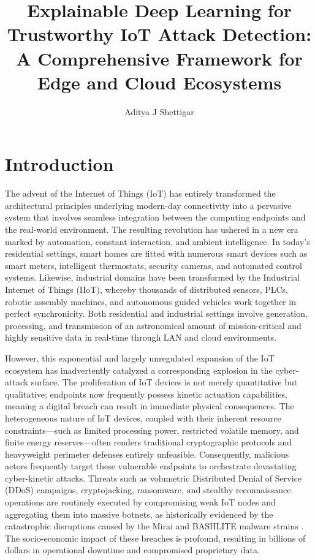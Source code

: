 \documentclass[12pt]{article}
\title{Explainable Deep Learning for Trustworthy IoT Attack Detection: A Comprehensive Framework for Edge and Cloud Ecosystems}
\author{Aditya J Shettigar}
\date{}
\begin{document}
    \maketitle


    \section{Introduction}
    The advent of the Internet of Things (IoT) has entirely transformed the architectural principles underlying modern-day connectivity into a pervasive system that involves seamless integration between the computing endpoints and the real-world environment. The resulting revolution has ushered in a new era marked by automation, constant interaction, and ambient intelligence. In today's residential settings, smart homes are fitted with numerous smart devices such as smart meters, intelligent thermostats, security cameras, and automated control systems. Likewise, industrial domains have been transformed by the Industrial Internet of Things (IIoT), whereby thousands of distributed sensors, PLCs, robotic assembly machines, and autonomous guided vehicles work together in perfect synchronicity. Both residential and industrial settings involve generation, processing, and transmission of an astronomical amount of mission-critical and highly sensitive data in real-time through LAN and cloud environments.

    However, this exponential and largely unregulated expansion of the IoT ecosystem has inadvertently catalyzed a corresponding explosion in the cyber-attack surface. The proliferation of IoT devices is not merely quantitative but qualitative; endpoints now frequently possess kinetic actuation capabilities, meaning a digital breach can result in immediate physical consequences. The heterogeneous nature of IoT devices, coupled with their inherent resource constraints—such as limited processing power, restricted volatile memory, and finite energy reserves—often renders traditional cryptographic protocols and heavyweight perimeter defenses entirely unfeasible. Consequently, malicious actors frequently target these vulnerable endpoints to orchestrate devastating cyber-kinetic attacks. Threats such as volumetric Distributed Denial of Service (DDoS) campaigns, cryptojacking, ransomware, and stealthy reconnaissance operations are routinely executed by compromising weak IoT nodes and aggregating them into massive botnets, as historically evidenced by the catastrophic disruptions caused by the Mirai and BASHLITE malware strains \cite{nguyen2022explainable, siganos2023explainable}. The socio-economic impact of these breaches is profound, resulting in billions of dollars in operational downtime and compromised proprietary data.
\end{document}
